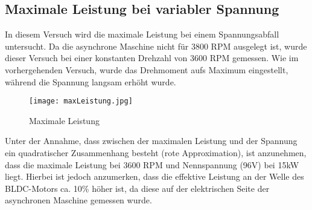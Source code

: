 \subsection{Maximale Leistung bei variabler Spannung}\label{subsec:LeistungSpannungsabfall}
In diesem Versuch wird die maximale Leistung bei einem Spannungsabfall untersucht. Da die asynchrone Maschine nicht für 3800 RPM ausgelegt ist, wurde dieser Versuch bei einer konstanten Drehzahl von 3600 RPM gemessen. Wie im vorhergehenden Versuch, wurde das Drehmoment aufs Maximum eingestellt, während die Spannung langsam erhöht wurde.


\begin{figure}[H]
	\centering
	\texttt{[image: maxLeistung.jpg]}
	\caption{Maximale Leistung}\label{fig:maxLeistung}
\end{figure}

Unter der Annahme, dass zwischen der maximalen Leistung und der Spannung ein quadratischer Zusammenhang besteht (rote Approximation), ist anzunehmen, dass die maximale Leistung bei 3600 RPM und Nennspannung (96V) bei 15kW liegt. Hierbei ist jedoch anzumerken, dass die effektive Leistung an der Welle des BLDC-Motors ca. 10\% höher ist, da diese auf der elektrischen Seite der asynchronen Maschine gemessen wurde.
 